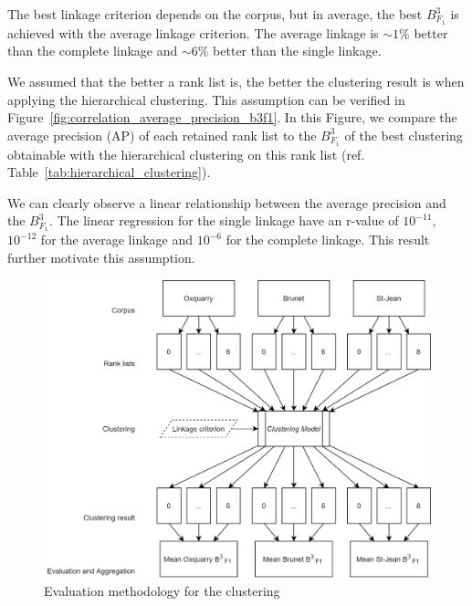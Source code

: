 The best linkage criterion depends on the corpus, but in average, the best $B^3_{F_1}$ is achieved with the average linkage criterion.
The average linkage is $\sim 1\%$ better than the complete linkage and $\sim 6\%$ better than the single linkage.

We assumed that the better a rank list is, the better the clustering result is when applying the hierarchical clustering.
This assumption can be verified in Figure~\ref{fig:correlation_average_precision_b3f1}.
In this Figure, we compare the average precision (AP) of each retained rank list to the $B^3_{F_1}$ of the best clustering obtainable with the hierarchical clustering on this rank list (ref. Table~\ref{tab:hierarchical_clustering}).

We can clearly observe a linear relationship between the average precision and the $B^3_{F_1}$.
The linear regression for the single linkage have an r-value of $10^{-11}$, $10^{-12}$ for the average linkage and $10^{-6}$ for the complete linkage.
This result further motivate this assumption.

\begin{figure}
  \centering
  \caption{Evaluation methodology for the clustering}
  \label{fig:clustering_evaluation_methodology}
  \includegraphics[width=0.7\linewidth]{img/clustering_evaluation_methodology.png}
\end{figure}

